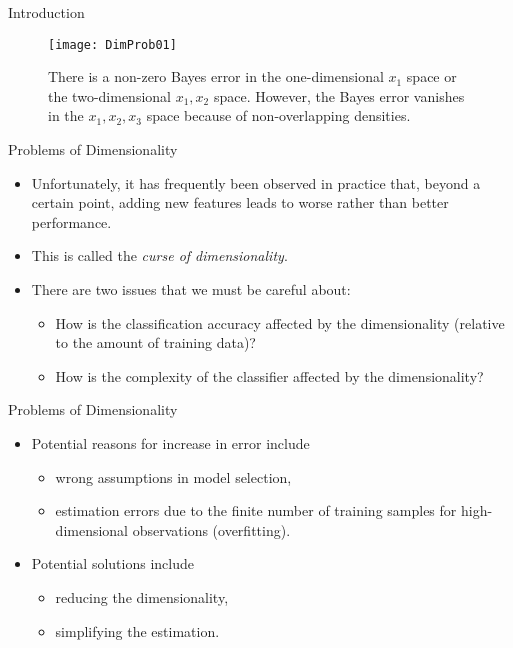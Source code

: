 \begin{frame}{Introduction}
\begin{figure}
\texttt{[image: DimProb01]}
\caption{There is a non-zero Bayes error in the one-dimensional $x_1$ space or the two-dimensional $x_1,x_2$ space. However, the Bayes error vanishes in the $x_1,x_2,x_3$ space because of non-overlapping densities.} 
\end{figure}
\end{frame}

\begin{frame}{Problems of Dimensionality}
\begin{itemize}
\setlength{\itemsep}{12pt}
\item Unfortunately, it has frequently been observed in practice
that, beyond a certain point, adding new features leads to
worse rather than better performance.
\item This is called the \textit{\color{mycolor2}curse of dimensionality}.
\item There are two issues that we must be careful about:
\begin{itemize}
\item How is the classification accuracy affected by the
dimensionality (relative to the amount of training data)?
\item How is the complexity of the classifier affected by the
dimensionality?
\end{itemize}
\end{itemize}
\end{frame}

\begin{frame}{Problems of Dimensionality}
\begin{itemize}
\setlength{\itemsep}{12pt}
\item Potential reasons for increase in error include
\begin{itemize}
\item wrong assumptions in model selection,
\item estimation errors due to the finite number of training samples for high-dimensional observations (overfitting).
\end{itemize}
\item Potential solutions include
\begin{itemize}
\item reducing the dimensionality,
\item simplifying the estimation.
\end{itemize}
\end{itemize}
\end{frame}

